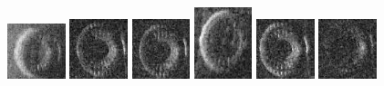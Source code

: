 \begin{figure}
    \includegraphics[width=0.15\textwidth]{chapters/images/dataset/all-class-images/tire/tire-131.jpg}
    \includegraphics[width=0.15\textwidth]{chapters/images/dataset/all-class-images/tire/tire-206.jpg}
    \includegraphics[width=0.15\textwidth]{chapters/images/dataset/all-class-images/tire/tire-233.jpg}
    \includegraphics[width=0.15\textwidth]{chapters/images/dataset/all-class-images/tire/tire-96.jpg}
    \includegraphics[width=0.15\textwidth]{chapters/images/dataset/all-class-images/tire/tire-251.jpg}
    \includegraphics[width=0.15\textwidth]{chapters/images/dataset/all-class-images/tire/tire-330.jpg}
    

\end{figure}
